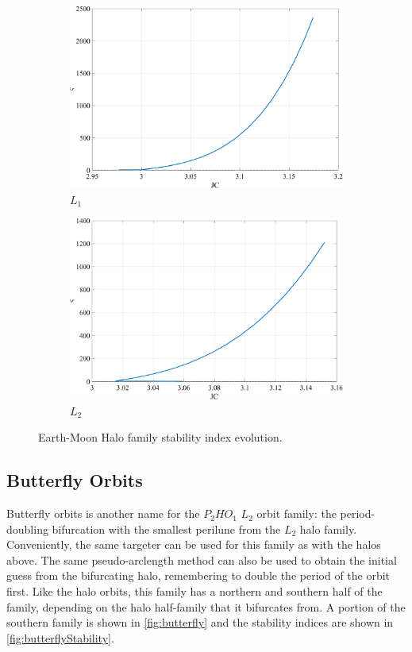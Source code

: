\begin{figure}[H]
    \begin{subfigure}[h]{0.4\linewidth}
        \includegraphics[width=\textwidth]{figures/L1HaloStability.pdf}
        \caption{$L_{1}$}
    \end{subfigure}
    \hfill
    \begin{subfigure}[h]{0.4\linewidth}
        \includegraphics[width=\textwidth]{figures/L2HaloStability.pdf}
        \caption{$L_{2}$}
    \end{subfigure}
    \caption{Earth-Moon Halo family stability index evolution.}
    \label{fig:haloStability}
\end{figure}

\subsection{Butterfly Orbits}
Butterfly orbits is another name for the $P_{2}HO_{1}$ $L_{2}$ orbit family: the period-doubling
bifurcation with the smallest perilune from the $L_{2}$ halo family\cite{ZimovanSpreen:2021}.
Conveniently, the same targeter can be used for this family as with the halos above. The same
pseudo-arclength method can also be used to obtain the initial guess from the bifurcating halo,
remembering to double the period of the orbit first. Like the halo orbits, this family has a
northern and southern half of the family, depending on the halo half-family that it bifurcates
from. A portion of the southern family is shown in \cref{fig:butterfly} and the stability indices
are shown in \cref{fig:butterflyStability}.

